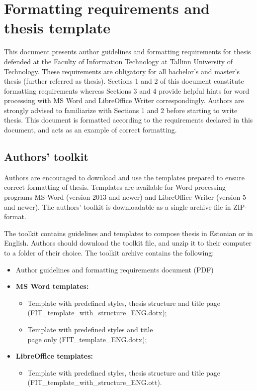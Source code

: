 \section{Formatting requirements and thesis template}
\label{Introduction} %

This document presents author guidelines and formatting requirements
for thesis defended at the Faculty of Information Technology at
Tallinn University of Technology. These requirements are obligatory
for all bachelor’s and master’s thesis (further referred as
thesis). Sections 1 and 2 of this document constitute formatting
requirements whereas Sections 3 and 4 provide helpful hints for word
processing with MS Word and LibreOffice Writer
correspondingly. Authors are strongly advised to familiarize with
Sections 1 and 2 before starting to write thesis. This document is
formatted according to the requirements declared in this document, and
acts as an example of correct formatting.

\subsection{Authors’ toolkit}

Authors are encouraged to download and use the templates prepared to
ensure correct formatting of thesis. Templates are available for Word
processing programs MS Word (version 2013 and newer) and LibreOffice
Writer (version 5 and newer). The authors’ toolkit is downloadable as
a single archive file in ZIP-format.

The toolkit contains guidelines and templates to compose thesis in
Estonian or in English. Authors should download the toolkit file, and
unzip it to their computer to a folder of their choice. The toolkit
archive contains the following:

\begin{itemize}
\item  Author guidelines and formatting requirements document (PDF)
\item \textbf{MS Word templates:}
  \begin{itemize}
  \item Template with predefined styles, thesis
    structure and title page \\
    (FIT\_template\_with\_structure\_ENG.dotx);
  \item Template with predefined styles and title \\
    page only (FIT\_template\_ENG.dotx);
  \end{itemize}
\item \textbf{LibreOffice templates:}
  \begin{itemize}
  \item Template with predefined styles, thesis
    structure and title page \\
    (FIT\_template\_with\_structure\_ENG.ott).
  \end{itemize}
\end{itemize}

